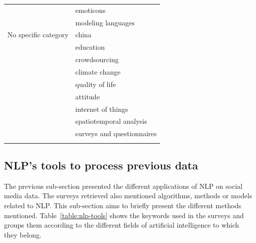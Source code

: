 \begin{center}
\begin{longtable}{ rl }
                                & emoticons                       \\
                                & modeling languages              \\
        No specific category    & china                           \\
                                & education                       \\
                                & crowdsourcing                   \\
                                & climate change                  \\
                                & quality of life                 \\
                                & attitude                        \\
                                & internet of things              \\
                                & spatiotemporal analysis         \\
                                & surveys and questionnaires      \\
        \bottomrule
        \label{table:application-domains}
    \end{longtable}
\end{center}

\subsection{NLP's tools to process previous data}
The previous sub-section presented the different applications of NLP on social media data.
The surveys retrieved also mentioned algorithms, methods or models related to NLP.
This sub-section aims to briefly present the different methods mentioned.
Table~\ref{table:nlp-tools} shows the keywords used in the surveys and groups them according to the different fields of artificial intelligence to which they belong.


